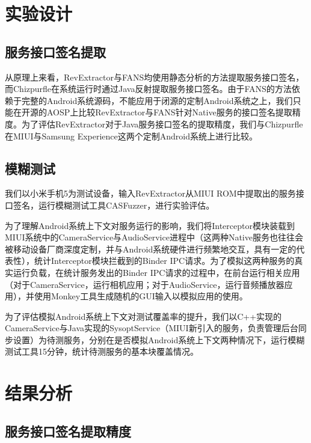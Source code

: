 \documentclass[winfonts,master,twoside]{njuthesis}
\begin{document}
\section{实验设计}

\subsection{服务接口签名提取}

从原理上来看，RevExtractor与FANS均使用静态分析的方法提取服务接口签名，而Chizpurfle在系统运行时通过Java反射提取服务接口签名。由于FANS的方法依赖于完整的Android系统源码，不能应用于闭源的定制Android系统之上，我们只能在开源的AOSP上比较RevExtractor与FANS针对Native服务的接口签名提取精度。为了评估RevExtractor对于Java服务接口签名的提取精度，我们与Chizpurfle在MIUI与Samsung Experience这两个定制Android系统上进行比较。

\subsection{模糊测试}

我们以小米手机5为测试设备，输入RevExtractor从MIUI ROM中提取出的服务接口签名，运行模糊测试工具CASFuzzer，进行实验评估。

为了理解Android系统上下文对服务运行的影响，我们将Interceptor模块装载到MIUI系统中的CameraService与AudioService进程中（这两种Native服务也往往会被移动设备厂商深度定制，并与Android系统硬件进行频繁地交互，具有一定的代表性），统计Interceptor模块拦截到的Binder IPC请求。为了模拟这两种服务的真实运行负载，在统计服务发出的Binder IPC请求的过程中，在前台运行相关应用（对于CameraService，运行相机应用；对于AudioService，运行音频播放器应用），并使用Monkey工具\cite{monkey}生成随机的GUI输入以模拟应用的使用。

为了评估模拟Android系统上下文对测试覆盖率的提升，我们以C++实现的CameraService与Java实现的SysoptService（MIUI新引入的服务，负责管理后台同步设置）为待测服务，分别在是否模拟Android系统上下文两种情况下，运行模糊测试工具15分钟，统计待测服务的基本块覆盖情况。

\section{结果分析}

\subsection{服务接口签名提取精度}
\end{document}
